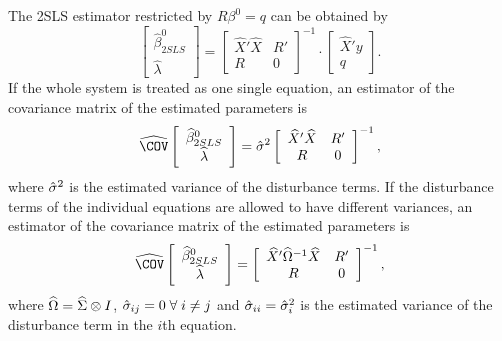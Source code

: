 The 2SLS estimator restricted by $R \beta^0 = q$ can be obtained by
\begin{equation}
   \left[ \begin{array}{c}
      \widehat{\beta}^0_{2SLS} \\ \widehat{\lambda}
   \end{array} \right]
   =
   \left[ \begin{array}{cc}
      \widehat{X}' \widehat{X} & R' \\ 
      R & 0
   \end{array} \right]^{-1}
   \cdot
   \left[ \begin{array}{c}
      \widehat{X}' y \\ q 
   \end{array} \right] .
   \label{eq:beta2SLSr}
\end{equation}
If the whole system is treated as one single equation,
an estimator of the covariance matrix of the estimated parameters is
\begin{equation}
   \COVHat
   \left[ \begin{array}{c}
      \widehat{\beta}^0_{2SLS} \\ \widehat{\lambda}
   \end{array} \right] 
   = \sHat^2 
   \left[ \begin{array}{cc}
      \widehat{X}' \widehat{X} & R' \\ 
      R & 0
   \end{array} \right]^{-1} ,
\end{equation}
where $\hat{\sigma}^2$ is the estimated variance of the disturbance terms.
If the disturbance terms of the individual equations
are allowed to have different variances, 
an estimator of the covariance matrix of the estimated parameters is
\begin{equation}
   \COVHat
   \left[ \begin{array}{c}
      \widehat{\beta}^0_{2SLS} \\ \widehat{\lambda}
   \end{array} \right] 
   = 
   \left[ \begin{array}{cc}
      \widehat{X}' \OHat^{-1} \widehat{X} & R' \\
      R & 0
   \end{array} \right]^{-1} ,
\end{equation}
where $\widehat{\Omega} = \widehat{\Sigma} \otimes I$,
$\hat{\sigma}_{ij} = 0 \; \forall \; i \neq j$ and
$\hat{\sigma}_{ii} = \hat{\sigma}_i^2$ is the estimated variance
of the disturbance term in the $i$th equation.


